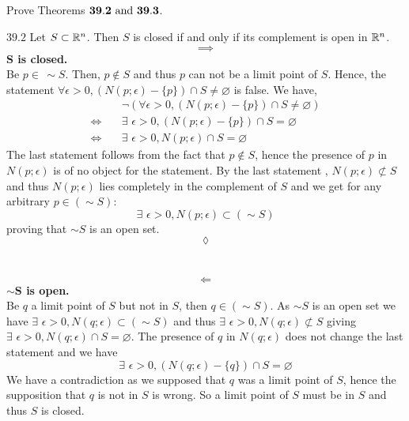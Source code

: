 \subsection{}
\begin{tcolorbox}
Prove Theorems $\mathbf{39.2}\text{ and } \mathbf{39.3}$.
\end{tcolorbox}
$$ $$
$\mathbf{39.2}$ Let $S\subset \mathbb{R}^n$. Then $S$ is closed if and only if its complement is open in $\mathbb{R}^n$.
$$\implies$$
\textbf{$\mathbf{S}$ is closed.}\\
Be $p\in \, \sim S$. Then, $p\not \in  S$ and thus $p$ can not be a limit point of $S$. Hence, the statement $\forall \epsilon >0,\left(N(p;\epsilon)-\{p\}\right)\cap S\neq \varnothing$ is false. We have,
\begin{align*}
&\neg\left(\forall \epsilon >0,\left(N(p;\epsilon)-\{p\}\right)\cap S\neq \varnothing\right)\\
\Leftrightarrow\quad &\exists\,\, \epsilon >0,\left(N(p;\epsilon)-\{p\}\right)\cap S= \varnothing\\
\Leftrightarrow\quad &\exists\,\, \epsilon >0,N(p;\epsilon)\cap S= \varnothing
\end{align*}
The last statement follows from the fact that $p\not\in S$, hence the presence of $p$ in $N(p;\epsilon)$ is of no object for the statement.
By the last statement , $N(p;\epsilon)\not\subset S$ and thus $N(p;\epsilon)$ lies completely in the complement of $S$ and we get for any arbitrary $p\in(\sim S)$:
$$\exists\,\, \epsilon >0,N(p;\epsilon)\subset (\sim S)$$
proving that $\sim S$ is an open set.
$$\lozenge$$\\\\
$$\Leftarrow$$
\textbf{$\mathbf{\sim S}$ is open.}\\
Be $q$ a limit point of $S$ but not in $S$, then $q\in(\sim S)$. As $\sim S$ is an open set we have $\exists\,\,\epsilon >0, N(q;\epsilon)\subset (\sim S)$ and thus $\exists\,\,\epsilon >0, N(q;\epsilon)\not \subset S$ giving $\exists\,\,\epsilon >0, N(q;\epsilon) \cap S=\varnothing$. The presence of $q$ in $N(q;\epsilon)$ does not change the last statement and we have
$$\exists\,\,\epsilon >0, \left(N(q;\epsilon)-\{q\}\right)\cap S=\varnothing$$
We have a contradiction as we supposed that $q$ was a limit point of $S$, hence the supposition that $q$ is not in $S$ is wrong. So a limit point of $S$ must be in $S$ and thus $S$ is closed.
